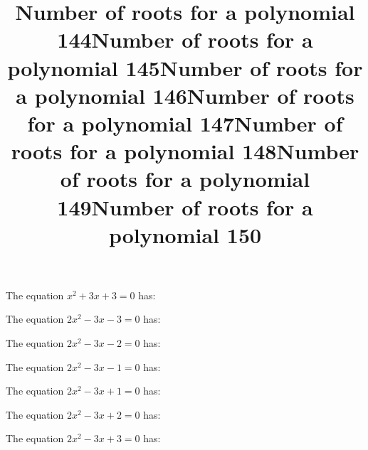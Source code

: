 \documentclass{article}
\begin{document}
\begin{category}
\begin{question}[multichoice]
\end{question}
\begin{question}[multichoice]
\title{Number of roots for a polynomial 144}
The equation $x^{2} + 3 x + 3=0$ has:



\end{question}
\begin{question}[multichoice]
\title{Number of roots for a polynomial 145}
The equation $2 x^{2} - 3 x - 3=0$ has:



\end{question}
\begin{question}[multichoice]
\title{Number of roots for a polynomial 146}
The equation $2 x^{2} - 3 x - 2=0$ has:



\end{question}
\begin{question}[multichoice]
\title{Number of roots for a polynomial 147}
The equation $2 x^{2} - 3 x - 1=0$ has:



\end{question}
\begin{question}[multichoice]
\title{Number of roots for a polynomial 148}
The equation $2 x^{2} - 3 x + 1=0$ has:



\end{question}
\begin{question}[multichoice]
\title{Number of roots for a polynomial 149}
The equation $2 x^{2} - 3 x + 2=0$ has:



\end{question}
\begin{question}[multichoice]
\title{Number of roots for a polynomial 150}
The equation $2 x^{2} - 3 x + 3=0$ has:


\end{question}
\end{category}
\end{document}
